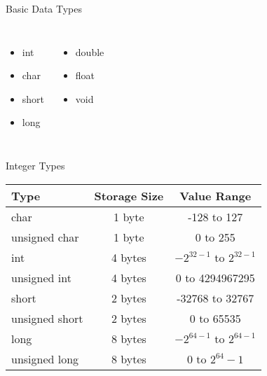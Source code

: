 \documentclass[compress]{beamer}
\begin{document}
\begin{slide}
	\begin{block}{Basic Data Types}

	\begin{columns}
	\begin{itemize}
	\item[] int
	\item[] char
	\item[] short
	\item[] long
	\end{itemize}

	\begin{itemize}
	\item[] double
	\item[] float
	\item[] void
	\end{itemize}
	\end{columns}

	\end{block}
\end{slide}

\begin{slide}
	\begin{block}{Integer Types}

	\begin{table}
	\begin{tabular}{lcc}
	\toprule
	Type & Storage Size & Value Range \\
	\midrule
	char & 1 byte & -128 to 127 \\
	unsigned char & 1 byte & 0 to 255 \\
	int & 4 bytes & $-2^{32-1}$ to $2^{32-1}$ \\
	unsigned int & 4 bytes & 0 to 4294967295 \\
	short & 2 bytes & -32768 to 32767 \\
	unsigned short & 2 bytes & 0 to 65535 \\
	long & 8 bytes & $-2^{64-1}$ to $2^{64-1}$ \\
	unsigned long & 8 bytes & 0 to $2^{64} - 1$ \\
	\bottomrule
	\end{tabular}
	\end{table}

	\end{block}
\end{slide}
\end{document}
